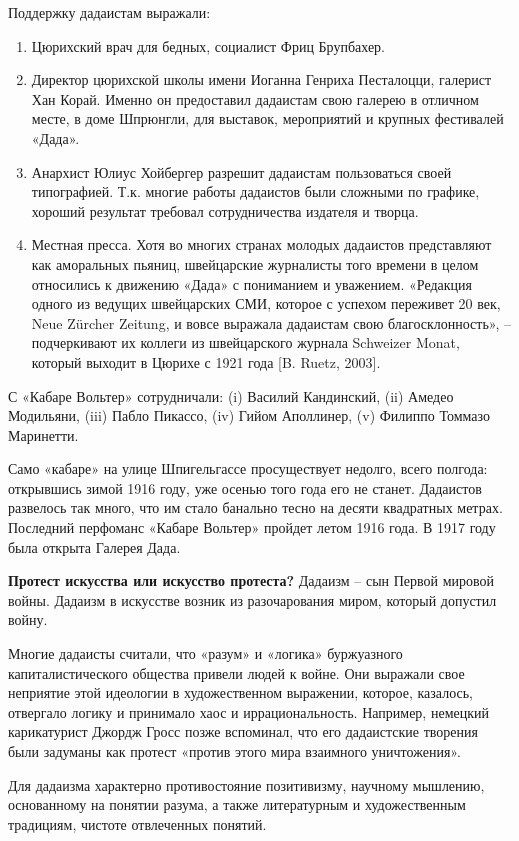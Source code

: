 Поддержку дадаистам выражали:
\begin{enumerate}
    \item Цюрихский врач для бедных, социалист Фриц Брупбахер.
    \item Директор цюрихской школы имени Иоганна Генриха Песталоцци, галерист Хан Корай. Именно он предоставил дадаистам свою галерею в отличном месте, в доме Шпрюнгли, для выставок, мероприятий и крупных фестивалей «Дада».
    \item Анархист Юлиус Хойбергер разрешит дадаистам пользоваться своей типографией. Т.к. многие работы дадаистов были сложными по графике, хороший результат требовал сотрудничества издателя и творца.
    \item Местная пресса. Хотя во многих странах молодых дадаистов представляют как аморальных пьяниц, швейцарские журналисты того времени в целом относились к движению «Дада» с пониманием и уважением. «Редакция одного из ведущих швейцарских СМИ, которое с успехом переживет 20 век, Neue Zürcher Zeitung, и вовсе выражала дадаистам свою благосклонность», – подчеркивают их коллеги из швейцарского журнала Schweizer Monat, который выходит в Цюрихе с 1921 года [B. Ruetz, 2003].
\end{enumerate}

С «Кабаре Вольтер» сотрудничали: (i) Василий Кандинский, (ii) Амедео Модильяни, (iii) Пабло Пикассо, (iv) Гийом Аполлинер, (v) Филиппо Томмазо Маринетти.

Само «кабаре» на улице Шпигельгассе просуществует недолго, всего полгода: открывшись зимой 1916 году, уже осенью того года его не станет. Дадаистов развелось так много, что им стало банально тесно на десяти квадратных метрах. Последний перфоманс «Кабаре Вольтер» пройдет летом 1916 года. В 1917 году была открыта Галерея Дада.

\textbf{Протест искусства или искусство протеста?}
Дадаизм – сын Первой мировой войны. Дадаизм в искусстве возник из разочарования миром, который допустил войну.

Многие дадаисты считали, что «разум» и «логика» буржуазного капиталистического общества привели людей к войне. Они выражали свое неприятие этой идеологии в художественном выражении, которое, казалось, отвергало логику и принимало хаос и иррациональность. Например, немецкий карикатурист Джордж Гросс позже вспоминал, что его дадаистские творения были задуманы как протест «против этого мира взаимного уничтожения».

Для дадаизма характерно противостояние позитивизму, научному мышлению, основанному на понятии разума, а также литературным и художественным традициям, чистоте отвлеченных понятий.

